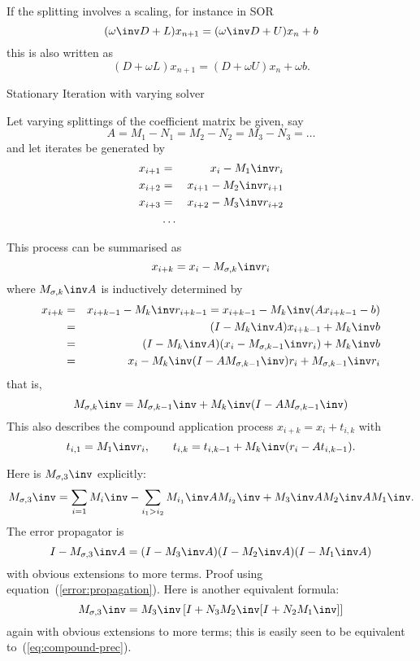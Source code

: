 If the splitting involves a scaling, for instance in SOR
\[ (\omega\inv D+L)x_{n+1}=(\omega\inv D+U)x_n+b \]
this is also written as
\[ ( D+\omega L)x_{n+1}=( D+\omega U)x_n+\omega b. \]

 {Stationary Iteration with varying solver}

Let varying splittings of the coefficient matrix be given, say
\[ A= M_1-N_1=M_2-N_2=M_3-N_3=\ldots\]
and let iterates be generated by 
\begin{eqnarray*}
x_{i+1} &=& x_i- M_1\inv r_i\\
x_{i+2} &=& x_{i+1}- M_2\inv r_{i+1}\\
x_{i+3} &=& x_{i+2}- M_3\inv r_{i+2}\\
&\ldots&
\end{eqnarray*}

This process can be summarised as
\[ x_{i+k} = x_i-M_{\sigma,k}\inv r_i \]
where $M_{\sigma,k}\inv A$ is inductively determined by
\begin{eqnarray*}
x_{i+k}&=&x_{i+k-1}-M_k\inv r_{i+k-1}=x_{i+k-1}-M_k\inv(Ax_{i+k-1}-b)\\
    &=&(I-M_k\inv A)x_{i+k-1}+M_k\inv b\\
    &=&(I-M_k\inv A)(x_i-M_{\sigma,k-1}\inv r_i)+M_k\inv b\\
    &=&x_i-M_k\inv(I-AM_{\sigma,k-1}\inv)r_i +M_{\sigma,k-1}\inv r_i
\end{eqnarray*}
that is,
\begin{equation}
  M_{\sigma,k}\inv = M_{\sigma,k-1}\inv+M_{k}\inv(I-AM_{\sigma,k-1}\inv)
  \label{eq:compound-prec}\end{equation}
This also describes the compound application process
$x_{i+k}=x_i+t_{i,k}$ with
\[ t_{i,1}=M_1\inv r_i,\qquad t_{i,k} = t_{i,k-1}+M_k\inv(r_i-At_{i,k-1}). \]

Here is $M_{\sigma,3}\inv$ explicitly:
 \[ M_{\sigma,3}\inv=\sum_{i=1} M_i\inv
    -\sum_{i_1>i_2}M_{i_1}\inv AM_{i_2}\inv + M_3\inv AM_2\inv AM_1\inv. \]
The error propagator is
\[ I-M_{\sigma,3}\inv A = (I-M_3\inv A)(I-M_2\inv A)(I-M_1\inv A) \]
with obvious extensions to more terms. Proof using 
equation~(\ref{error:propagation}). 
Here is another equivalent formula:
\begin{equation}
   M_{\sigma,3}\inv = 
   M_3\inv\left[I+N_3M_2\inv[I+N_2M_1\inv]
           \right]
	\label{eq:multiplicative:stat:mult}\end{equation}
again with obvious extensions to more terms;
this is easily seen to be equivalent to~(\ref{eq:compound-prec}).

